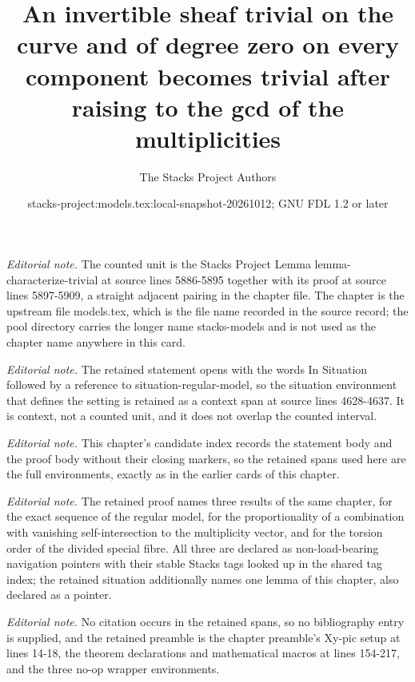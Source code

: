 \documentclass[10pt,a4paper]{amsart}
\title{An invertible sheaf trivial on the curve and of degree zero on every component becomes trivial after raising to the gcd of the multiplicities}
\author{The Stacks Project Authors}
\date{stacks-project:models.tex:local-snapshot-20261012; GNU FDL 1.2 or later}
\theoremstyle{plain}
\theoremstyle{definition}
\theoremstyle{remark}
\numberwithin{equation}{subsection}
\begin{document}
\maketitle
\noindent\textit{Editorial note.} The counted unit is the Stacks Project Lemma lemma-characterize-trivial at source lines 5886-5895 together with its proof at source lines 5897-5909, a straight adjacent pairing in the chapter file. The chapter is the upstream file models.tex, which is the file name recorded in the source record; the pool directory carries the longer name stacks-models and is not used as the chapter name anywhere in this card.\par\medskip
\noindent\textit{Editorial note.} The retained statement opens with the words In Situation followed by a reference to situation-regular-model, so the situation environment that defines the setting is retained as a context span at source lines 4628-4637. It is context, not a counted unit, and it does not overlap the counted interval.\par\medskip
\noindent\textit{Editorial note.} This chapter's candidate index records the statement body and the proof body without their closing markers, so the retained spans used here are the full environments, exactly as in the earlier cards of this chapter.\par\medskip
\noindent\textit{Editorial note.} The retained proof names three results of the same chapter, for the exact sequence of the regular model, for the proportionality of a combination with vanishing self-intersection to the multiplicity vector, and for the torsion order of the divided special fibre. All three are declared as non-load-bearing navigation pointers with their stable Stacks tags looked up in the shared tag index; the retained situation additionally names one lemma of this chapter, also declared as a pointer.\par\medskip
\noindent\textit{Editorial note.} No citation occurs in the retained spans, so no bibliography entry is supplied, and the retained preamble is the chapter preamble's Xy-pic setup at lines 14-18, the theorem declarations and mathematical macros at lines 154-217, and the three no-op wrapper environments.\par\medskip
\end{document}
